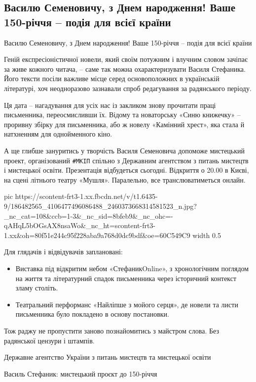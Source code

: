  
 
 
 
 

\subsection{Василю Семеновичу, з Днем народження! Ваше 150-річчя – подія для всієї країни}
\label{sec:14_05_2021.fb.tkachenko_aleksandr.1.stefanyk_150}

Василю Семеновичу, з Днем народження! Ваше 150-річчя – подія для всієї країни

Геній експресіоністичної новели, який своїм потужним і влучним словом зачіпає
за живе кожного читача, – саме так можна охарактеризувати Василя Стефаника.
Його тексти посіли важливе місце серед основоположних в українській літературі,
хоч неодноразово зазнавали спроб редагування за радянського періоду.

Ця дата – нагадування для усіх нас із закликом знову прочитати праці
письменника, переосмисливши їх. Відому та новаторську «Синю книжечку» –
проривну збірку для письменника, або ж новелу «Камінний хрест», яка стала й
натхненням для однойменного кіно. 

А ще глибше зануритись у творчість Василя Семеновича допоможе мистецький
проект, організований \verb|#МКІП| спільно з Державним агентством з питань мистецтв і
мистецької освіти. Презентація відбудеться сьогодні. Відкриття о 20.00 в Києві,
на сцені літнього театру «Мушля». Паралельно, все транслюватиметься онлайн. 

\ifcmt
  pic https://scontent-frt3-1.xx.fbcdn.net/v/t1.6435-9/186482565_4106477496086488_2460373668314581523_n.jpg?_nc_cat=108&ccb=1-3&_nc_sid=8bfeb9&_nc_ohc=-qAHqL5bOGsAX8nsaWo&_nc_ht=scontent-frt3-1.xx&oh=80f51e244c95f228aba9a768d0dc9bdf&oe=60C549C9
  width 0.5
\fi

Для глядачів і відвідувачів заплановані:

\begin{itemize}
  
\item Виставка під відкритим небом «СтефаникOnline», з хронологічним поглядом на життя та літературний спадок письменника через історичний контекст зламу століть.

\item Театральний перформанс «Найліпше з мойого серця», де новели та листи
        письменника було покладено в основу постановки.
\end{itemize}

Тож раджу не пропустити заново познайомитись з майстром слова. Без радянської цензури і штампів.

Державне агентство України з питань мистецтв та мистецької освіти

Василь Стефаник: мистецький проєкт до 150-річчя
